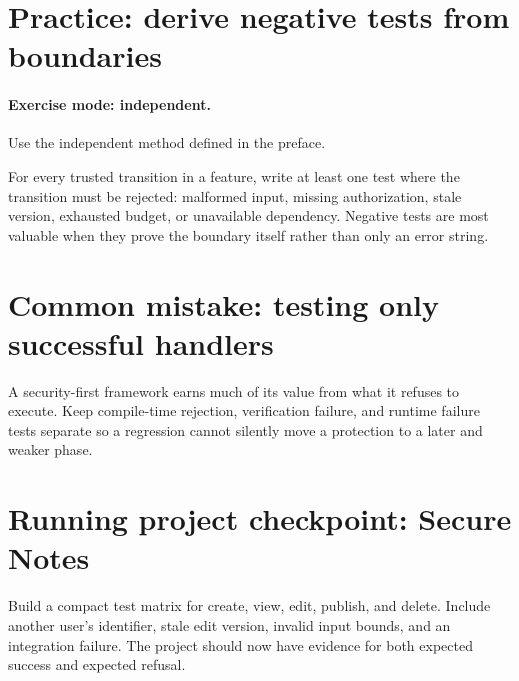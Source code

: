 \section{Practice: derive negative tests from boundaries}
\paragraph{Exercise mode: independent.} Use the independent method defined in the preface.

For every trusted transition in a feature, write at least one test where the transition must be rejected: malformed input, missing authorization, stale version, exhausted budget, or unavailable dependency. Negative tests are most valuable when they prove the boundary itself rather than only an error string.

\section{Common mistake: testing only successful handlers}
A security-first framework earns much of its value from what it refuses to execute. Keep compile-time rejection, verification failure, and runtime failure tests separate so a regression cannot silently move a protection to a later and weaker phase.

\section{Running project checkpoint: Secure Notes}
Build a compact test matrix for create, view, edit, publish, and delete. Include another user's identifier, stale edit version, invalid input bounds, and an integration failure. The project should now have evidence for both expected success and expected refusal.
